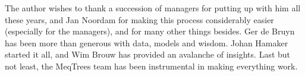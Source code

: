 \documentclass[]{aa}
\begin{document}
\begin{acknowledgements}

The author wishes to thank a succession of managers for putting up with him all these years, and Jan Noordam for 
making this process considerably easier (especially for the managers), and for many other things besides. Ger de Bruyn has been more than generous with data, models and wisdom. Johan Hamaker started it all, and Wim Brouw has provided an avalanche of insights. Last but not least, the MeqTrees team has been instrumental in making everything work.

\end{acknowledgements}




\end{document}
